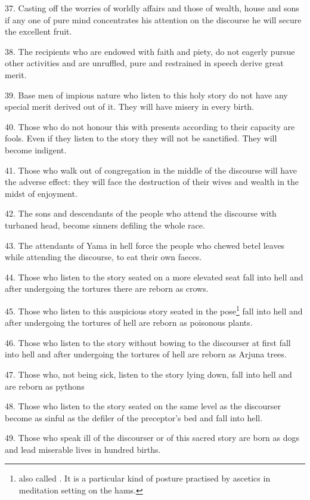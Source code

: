 37. Casting off the worries of worldly affairs and those of wealth, house and
sons if any one of pure mind concentrates his attention on the discourse he will
secure the excellent fruit.

38. The recipients who are endowed with faith and piety, do not eagerly pursue
other activities and are unruffled, pure and restrained in speech derive great
merit.

39. Base men of impious nature who listen to this holy story do not have any
special merit derived out of it. They will have misery in every birth.

40. Those who do not honour this  with presents according to their
capacity are fools. Even if they listen to the story they will not be sanctified.
They will become indigent.

41. Those who walk out of congregation in the middle of the discourse will have
the adverse effect: they will face the destruction of their wives and wealth in
the midst of enjoyment.

42. The sons and descendants of the people who attend the discourse with
turbaned head, become sinners defiling the whole race.

43. The attendants of Yama in hell force the people who chewed betel leaves
while attending the discourse, to eat their own faeces.

44. Those who listen to the story seated on a more elevated seat fall into hell
and after undergoing the tortures there are reborn as crows.

45. Those who listen to this auspicious story seated in the 
pose\footnote{ also called . It is a particular
kind of posture practised by ascetics in meditation setting on the hams.} fall
into hell and after undergoing the tortures of hell are reborn as poisonous
plants.

46. Those who listen to the story without bowing to the discourser at first fall
into hell and after undergoing the tortures of hell are reborn as Arjuna trees.

47. Those who, not being sick, listen to the story lying down, fall into hell
and are reborn as pythons \etc

48. Those who listen to the story seated on the same level as the discourser
become as sinful as the defiler of the preceptor’s bed and fall into hell.

49. Those who speak ill of the discourser or of this sacred story are born as
dogs and lead miserable lives in hundred births.

